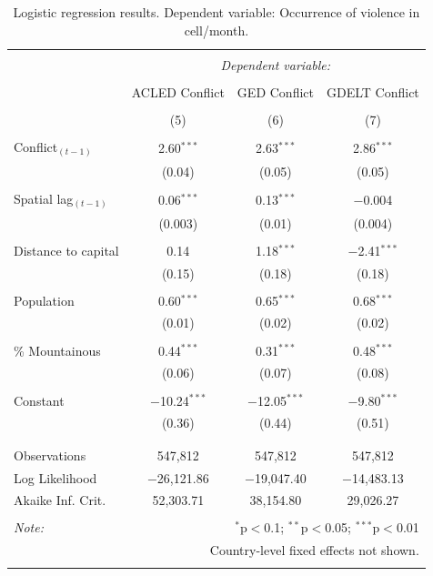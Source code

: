 \documentclass[hidelinks]{article}
\begin{document}
\begin{table}[!htbp] \centering 
\begin{tabular}{@{\extracolsep{5pt}}lccc} 
\\[-1.8ex]\hline 
\hline \\[-1.8ex] 
 & \multicolumn{3}{c}{\textit{Dependent variable:}} \\ 
\cline{2-4} 
\\[-1.8ex] & ACLED Conflict & GED Conflict & GDELT Conflict \\ 
\\[-1.8ex] & (5) & (6) & (7)\\ 
\hline \\[-1.8ex] 
 Conflict$_{(t-1)}$ & 2.60$^{***}$ & 2.63$^{***}$ & 2.86$^{***}$ \\ 
  & (0.04) & (0.05)  & (0.05) \\ 
  & & & \\ 
 Spatial lag$_{(t-1)}$ & 0.06$^{***}$ & 0.13$^{***}$ & $-$0.004 \\ 
  & (0.003) & (0.01) & (0.004) \\ 
  & & & \\ 
 Distance to capital & 0.14 & 1.18$^{***}$ & $-$2.41$^{***}$ \\ 
  & (0.15) & (0.18) & (0.18) \\ 
  & & & \\ 
 Population & 0.60$^{***}$ & 0.65$^{***}$ & 0.68$^{***}$ \\ 
  & (0.01) & (0.02) & (0.02) \\ 
  & & & \\ 
 \% Mountainous & 0.44$^{***}$ & 0.31$^{***}$ & 0.48$^{***}$ \\ 
  & (0.06) & (0.07) & (0.08) \\ 
  & & & \\ 
 Constant & $-$10.24$^{***}$ & $-$12.05$^{***}$ & $-$9.80$^{***}$ \\ 
  & (0.36) & (0.44) & (0.51) \\ 
  & & & \\ 
\hline \\[-1.8ex] 
Observations & 547,812 & 547,812 & 547,812 \\ 
Log Likelihood & $-$26,121.86 & $-$19,047.40 & $-$14,483.13 \\ 
Akaike Inf. Crit. & 52,303.71 & 38,154.80 & 29,026.27 \\ 
\hline 
\hline \\[-1.8ex] 
\textit{Note:}  & \multicolumn{3}{r}{$^{*}$p$<$0.1; $^{**}$p$<$0.05; $^{***}$p$<$0.01} \\ 
			& \multicolumn{3}{r}{Country-level fixed effects not shown.} \\ 
\normalsize 
\end{tabular} 
  \caption{Logistic regression results. Dependent variable: Occurrence of violence in cell/month.} \label{tab:regression2} 

\end{table} 
\end{document}
